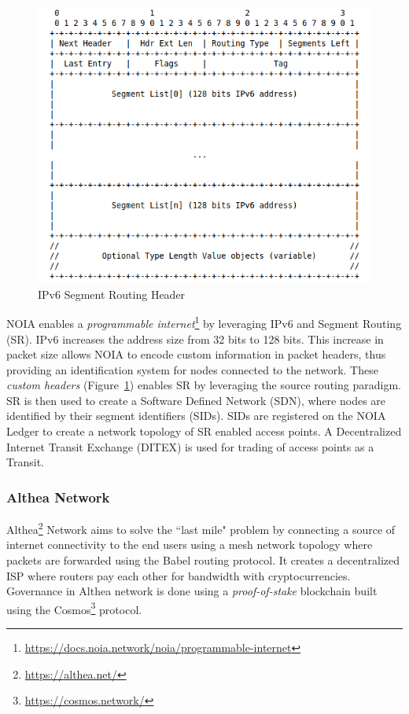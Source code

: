 		\begin{figure}[h]
			\includegraphics[width=\linewidth]{figures/ipv6-segment-header}
			\caption{\label{fig:segment-header} IPv6 Segment Routing Header\protect\footnotemark}
		\end{figure}
		
		NOIA enables a \textit{programmable internet}\footnote{\url{https://docs.noia.network/noia/programmable-internet}} by leveraging IPv6 and Segment Routing (SR). IPv6 increases the address size from 32 bits to 128 bits. This increase in packet size allows NOIA to encode custom information in packet headers, thus providing an identification system for nodes connected to the network. These \textit{custom headers} (Figure~\ref{fig:segment-header}) enables SR by leveraging the source routing paradigm. SR is then used to create a Software Defined Network (SDN), where nodes are identified by their segment identifiers (SIDs). SIDs are registered on the NOIA Ledger to create a network topology of SR enabled access points. A Decentralized Internet Transit Exchange (DITEX) is used for trading of access points as a Transit.
		
		\subsubsection{Althea Network}
		Althea\footnote{\url{https://althea.net/}} Network aims to solve the ``last mile" problem by connecting a source of internet connectivity to the end users using a mesh network topology where packets are forwarded using the Babel routing protocol\cite{chroboczek2011babel}. It creates a decentralized ISP where routers pay each other for bandwidth with cryptocurrencies. Governance in Althea network is done using a \textit{proof-of-stake} blockchain built using the Cosmos\footnote{\url{https://cosmos.network/}} protocol.
		
